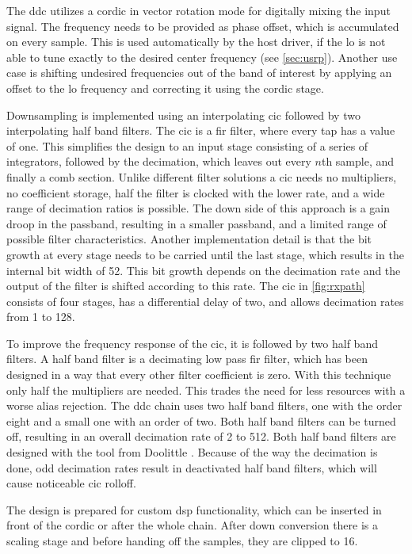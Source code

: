 \documentclass[12pt,a4paper,parskip=full,abstracton]{scrartcl}
\begin{document}
The \gls{ddc} utilizes a \gls{cordic} in vector rotation mode for digitally
mixing the input signal. The frequency needs to be provided as phase offset,
which is accumulated on every sample. This is used automatically by the host driver,
if the \gls{lo} is not able to tune exactly to the desired center frequency (see \cref{sec:usrp}).
Another use case is shifting undesired frequencies out of the band of
interest by applying an offset to the \gls{lo} frequency and correcting
it using the \gls{cordic} stage.

Downsampling is implemented using an interpolating \gls{cic} followed by two
interpolating half band filters. The \gls{cic} is a \gls{fir} filter, where every tap has
a value of one. This simplifies the design to an input stage consisting
of a series of integrators, followed by the decimation, which leaves out every
$n$th sample, and finally a comb section. Unlike different filter solutions
a \gls{cic} needs no multipliers, no coefficient storage, half the filter is
clocked with the lower rate, and a wide range of decimation ratios is possible. The down
side of this approach is a gain droop in the passband, resulting in a smaller
passband, and a limited range of possible filter characteristics\cite{hog81}.
Another implementation detail is that the bit growth at every stage needs to
be carried until the last stage, which results in the internal bit width of
\SI{52}{\bit}. This bit growth depends on the decimation rate\cite{hog81} and
the output of the filter is shifted according to this rate. The \gls{cic} in
\cref{fig:rxpath} consists of four stages, has a differential delay
of two, and allows decimation rates from 1 to 128.

To improve the frequency response of the \gls{cic}, it is followed by two half band
filters. A half band filter is a decimating low pass \gls{fir} filter, which has
been designed in a way that every other filter coefficient is zero. With this technique
only half the multipliers are needed. This trades the need for less resources with
a worse alias rejection. The \gls{ddc} chain uses two half band filters,
one with the order eight and a small one with an order of two. Both half band filters can be
turned off, resulting in an overall decimation rate of 2 to 512. Both half band
filters are designed with the tool from Doolittle \cite{halfband}. Because of
the way the decimation is done, odd decimation rates result in deactivated half band
filters, which will cause noticeable \gls{cic} rolloff.

The design is prepared for custom \gls{dsp} functionality, which can be inserted in front
of the cordic or after the whole chain. After down conversion there is a scaling stage and
before handing off the samples, they are clipped to \SI{16}{\bit}.
\end{document}

